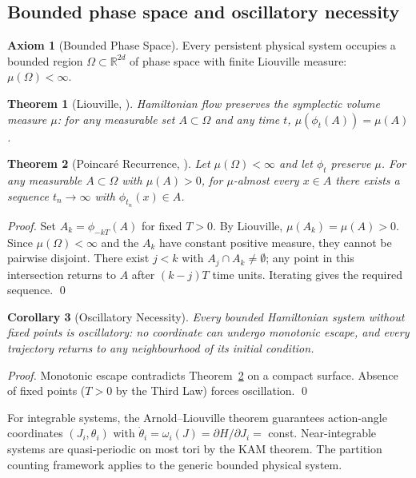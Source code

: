 \documentclass[twocolumn,10pt,a4paper]{article}
\theoremstyle{thmstyle}
\newtheorem{theorem}{Theorem}[section]
\newtheorem{corollary}[theorem]{Corollary}
\theoremstyle{definition}
\newtheorem{axiom}{Axiom}
\theoremstyle{remark}
\newcommand{\R}{\mathbb{R}}
\begin{document}
\subsection{Bounded phase space and oscillatory necessity}

\begin{axiom}[Bounded Phase Space]
\label{ax:bps}
Every persistent physical system occupies a bounded region
$\Omega \subset \R^{2d}$ of phase space with finite Liouville measure:
$\mu(\Omega) < \infty$.
\end{axiom}

\begin{theorem}[Liouville, \citealp{liouville1838}]
\label{thm:liouville}
Hamiltonian flow preserves the symplectic volume measure $\mu$:
for any measurable set $A \subset \Omega$ and any time $t$,
$\mu(\phi_t(A)) = \mu(A)$.
\end{theorem}

\begin{theorem}[Poincar{\'e} Recurrence, \citealp{poincare1890}]
\label{thm:poincare}
Let $\mu(\Omega) < \infty$ and let $\phi_t$ preserve $\mu$.
For any measurable $A \subset \Omega$ with $\mu(A) > 0$,
for $\mu$-almost every $x \in A$ there exists a sequence
$t_n \to \infty$ with $\phi_{t_n}(x) \in A$.
\end{theorem}

\begin{proof}
Set $A_k = \phi_{-kT}(A)$ for fixed $T > 0$. By Liouville,
$\mu(A_k) = \mu(A) > 0$. Since $\mu(\Omega) < \infty$ and the $A_k$
have constant positive measure, they cannot be pairwise disjoint.
There exist $j < k$ with $A_j \cap A_k \neq \emptyset$; any point in
this intersection returns to $A$ after $(k-j)T$ time units. Iterating
gives the required sequence. \qed
\end{proof}

\begin{corollary}[Oscillatory Necessity]
\label{cor:osc}
Every bounded Hamiltonian system without fixed points is oscillatory:
no coordinate can undergo monotonic escape, and every trajectory
returns to any neighbourhood of its initial condition.
\end{corollary}

\begin{proof}
Monotonic escape contradicts Theorem~\ref{thm:poincare} on a compact
surface. Absence of fixed points ($T > 0$ by the Third Law) forces
oscillation. \qed
\end{proof}

For integrable systems, the Arnold--Liouville theorem \citep{arnold1989}
guarantees action-angle coordinates $(J_i, \theta_i)$ with
$\dot{\theta}_i = \omega_i(J) = \partial H/\partial J_i = $ const.
Near-integrable systems are quasi-periodic on most tori by the KAM
theorem. The partition counting framework applies to the generic bounded
physical system.
\end{document}
